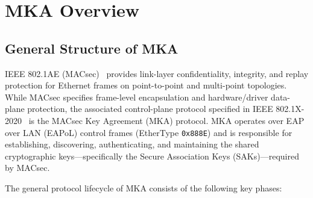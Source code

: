 \section{MKA Overview}
\label{sec:background}

\subsection{General Structure of MKA}

IEEE 802.1AE (MACsec)~\cite{ieee8021ae} provides link-layer confidentiality, integrity, and replay protection for Ethernet frames on point-to-point and multi-point topologies. While MACsec specifies frame-level encapsulation and hardware/driver data-plane protection, the associated control-plane protocol specified in IEEE 802.1X-2020~\cite{ieee8021x} is the MACsec Key Agreement (MKA) protocol. MKA operates over EAP over LAN (EAPoL) control frames (EtherType \texttt{0x888E}) and is responsible for establishing, discovering, authenticating, and maintaining the shared cryptographic keys—specifically the Secure Association Keys (SAKs)—required by MACsec.

The general protocol lifecycle of MKA consists of the following key phases:

